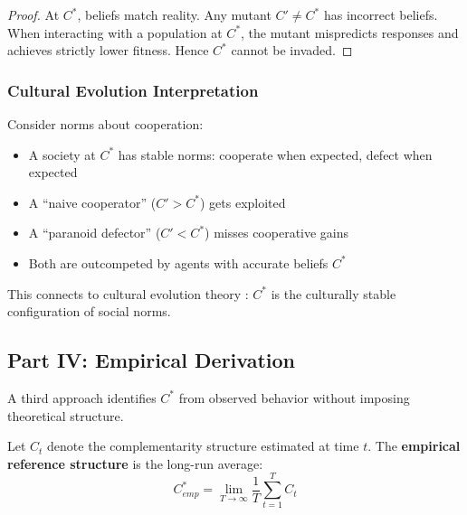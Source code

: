 \begin{proof}
At $C^*$, beliefs match reality. Any mutant $C' \neq C^*$ has incorrect beliefs.
When interacting with a population at $C^*$, the mutant mispredicts responses
and achieves strictly lower fitness. Hence $C^*$ cannot be invaded.
\end{proof}

\subsubsection{Cultural Evolution Interpretation}

Consider norms about cooperation:
\begin{itemize}[nosep]
    \item A society at $C^*$ has stable norms: cooperate when expected, defect when expected
    \item A ``naive cooperator'' ($C' > C^*$) gets exploited
    \item A ``paranoid defector'' ($C' < C^*$) misses cooperative gains
    \item Both are outcompeted by agents with accurate beliefs $C^*$
\end{itemize}

This connects to cultural evolution theory \citep{boydricherson, gintis2007}:
$C^*$ is the culturally stable configuration of social norms.



\subsection{Part IV: Empirical Derivation}
\label{sec:D-empirical}

A third approach identifies $C^*$ from observed behavior without
imposing theoretical structure.

\begin{definition}
\label{def:D-empirical}
Let $C_t$ denote the complementarity structure estimated at time $t$.
The \textbf{empirical reference structure} is the long-run average:
\begin{equation}
C^*_{emp} = \lim_{T \to \infty} \frac{1}{T} \sum_{t=1}^{T} C_t
\label{eq:D-empirical}
\end{equation}
\end{definition}

